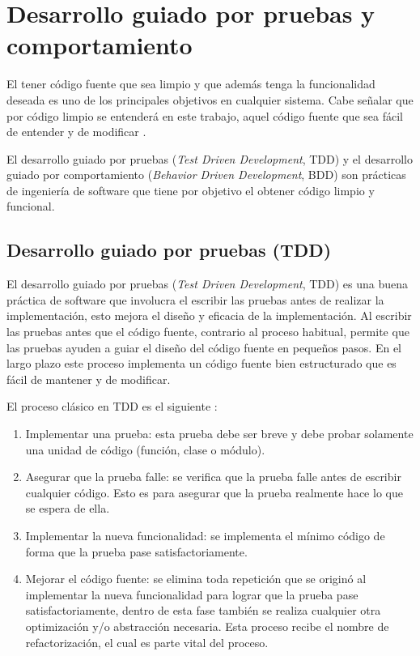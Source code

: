 \section{Desarrollo guiado por pruebas y comportamiento}
El tener código fuente que sea limpio y que además tenga la funcionalidad deseada
es uno de los principales objetivos en cualquier sistema. Cabe señalar que
por código limpio se entenderá en este trabajo, aquel código fuente que sea fácil
de entender y de modificar \cite{4_beck_2003}.

El desarrollo guiado por pruebas (\textit{Test Driven Development}, TDD) y el
desarrollo guiado por comportamiento (\textit{Behavior Driven Development}, BDD)
son prácticas de ingeniería de software que tiene por objetivo el obtener código
limpio y funcional.

\subsection{Desarrollo guiado por pruebas (TDD)}
El desarrollo guiado por pruebas (\textit{Test Driven Development}, TDD) es una
buena práctica de software que involucra el escribir las pruebas antes de
realizar la implementación, esto mejora el diseño y eficacia de la implementación.
Al escribir las pruebas antes que el código fuente, contrario al proceso habitual,
permite que las pruebas ayuden a guiar el diseño del código fuente en pequeños
pasos. En el largo plazo este proceso implementa un código fuente bien
estructurado que es fácil de mantener y de modificar\cite{4_beck_2003}.

\vspace{2.5mm}

El proceso clásico en TDD es el siguiente \cite{12_rappin_2010}:
\begin{enumerate}
\item Implementar una prueba: esta prueba debe ser breve y debe probar
  solamente una unidad de código (función, clase o módulo).
\item Asegurar que la prueba falle: se verifica que la prueba falle antes
  de escribir cualquier código. Esto es para asegurar que la prueba realmente
  hace lo que se espera de ella.
\item Implementar la nueva funcionalidad: se implementa el mínimo código de
  forma que la prueba pase satisfactoriamente.
\item Mejorar el código fuente: se elimina toda repetición que se originó al
  implementar la nueva funcionalidad para lograr que la prueba pase
  satisfactoriamente, dentro de esta fase también se realiza cualquier
  otra optimización y/o abstracción necesaria. Esta proceso recibe el nombre de
  refactorización, el cual es parte vital del proceso.
\end{enumerate}

